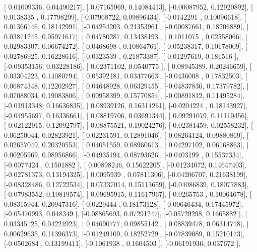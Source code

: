\documentclass{article}
\begin{document}
       [ 0.01009336,  0.04490217],
       [ 0.07165969,  0.14084413],
       [-0.00087952,  0.12920892],
       [ 0.0138335 ,  0.17798299],
       [-0.07968722,  0.09896434],
       [-0.0142291 ,  0.10096618],
       [ 0.01366146,  0.18142991],
       [-0.04254203,  0.21353961],
       [-0.00087661,  0.18206889],
       [ 0.03871245,  0.05971617],
       [ 0.04780287,  0.13438193],
       [ 0.1011075 ,  0.02558066],
       [ 0.02983307,  0.06674272],
       [-0.0468698 ,  0.10864761],
       [-0.05238317,  0.10178009],
       [ 0.02786925,  0.16228616],
       [-0.0323539 ,  0.21873387],
       [ 0.01297619,  0.181516  ],
       [-0.09353156,  0.03228186],
       [ 0.02371102,  0.0540775 ],
       [ 0.08945389,  0.20246659],
       [ 0.03304223,  0.14080794],
       [ 0.05392181,  0.03477663],
       [-0.0436008 ,  0.17832503],
       [ 0.06874348,  0.12202927],
       [ 0.04648928,  0.06329455],
       [-0.04837836,  0.17379782],
       [ 0.07088034,  0.19083806],
       [ 0.00958399,  0.15770854],
       [-0.00891812,  0.11495284],
       [-0.01913348,  0.16636835],
       [ 0.08939126,  0.16314261],
       [-0.0204224 ,  0.18143927],
       [-0.04955697,  0.16336661],
       [ 0.08819706,  0.03691344],
       [ 0.09291079,  0.11110456],
       [-0.02122915,  0.12092797],
       [ 0.08875521,  0.19024276],
       [ 0.02381459,  0.02558232],
       [ 0.06250044,  0.02823921],
       [ 0.02231591,  0.12891046],
       [ 0.08264124,  0.09880869],
       [ 0.02657049,  0.20320553],
       [ 0.04051559,  0.08960613],
       [ 0.04297102,  0.06168863],
       [ 0.00205969,  0.08956866],
       [-0.04935194,  0.08793626],
       [-0.0403199 ,  0.15537334],
       [-0.0077424 ,  0.1501882 ],
       [ 0.00898246,  0.15622205],
       [-0.01234072,  0.14647403],
       [-0.02781373,  0.13194325],
       [ 0.0095939 ,  0.07811306],
       [-0.04206707,  0.21638199],
       [-0.08328486,  0.12722534],
       [ 0.07337014,  0.15113659],
       [-0.04086839,  0.18077883],
       [-0.07983552,  0.19819574],
       [ 0.09695915,  0.11617967],
       [-0.0265753 ,  0.10064678],
       [ 0.08315944,  0.20947316],
       [-0.0229444 ,  0.18173128],
       [-0.00646434,  0.17445972],
       [-0.05470993,  0.048349  ],
       [-0.08865693,  0.07291247],
       [-0.05729298,  0.1665882 ],
       [ 0.03345125,  0.04224923],
       [ 0.04690777,  0.09855142],
       [ 0.08839478,  0.06314718],
       [ 0.00629635,  0.11396373],
       [-0.01249109,  0.18252729],
       [-0.07839089,  0.15210173],
       [-0.0502684 ,  0.13199411],
       [-0.1061938 ,  0.1604503 ],
       [-0.06191936,  0.037672  ],
\end{document}
